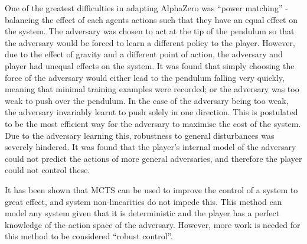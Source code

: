 \documentclass[../main.tex]{subfiles}
\begin{document}
One of the greatest difficulties in adapting AlphaZero was ``power matching'' - balancing the effect of each agents actions such that they have an equal effect on the system. The adversary was chosen to act at the tip of the pendulum so that the adversary would be forced to learn a different policy to the player. However, due to the effect of gravity and a different point of action, the adversary and player had unequal effects on the system. It was found that simply choosing the force of the adversary would either lead to the pendulum falling very quickly, meaning that minimal training examples were recorded; or the adversary was too weak to push over the pendulum. In the case of the adversary being too weak, the adversary invariably learnt to push solely in one direction. This is postulated to be the most efficient way for the adversary to maximise the cost of the system. Due to the adversary learning this, robustness to general disturbances was severely hindered. It was found that the player's internal model of the adversary could not predict the actions of more general adversaries, and therefore the player could not control these.

It has been shown that MCTS can be used to improve the control of a system to great effect, and system non-linearities do not impede this. This method can model any system given that it is deterministic and the player has a perfect knowledge of the action space of the adversary. However, more work is needed for this method to be considered ``robust control''.
\end{document}
